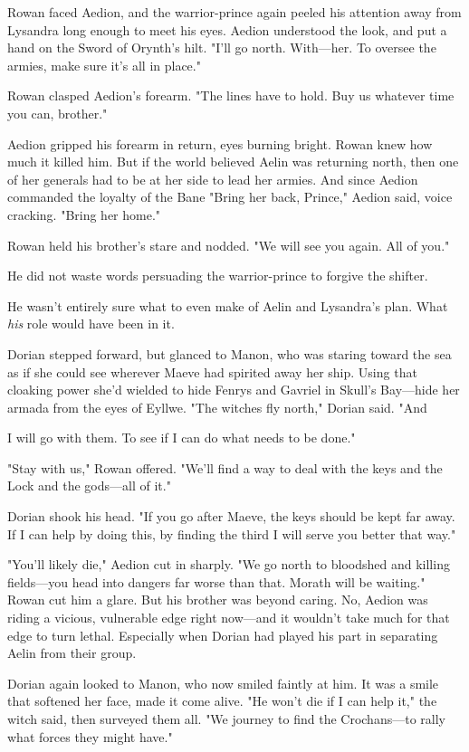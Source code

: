 Rowan faced Aedion, and the warrior-prince again peeled his attention away from Lysandra long enough to meet his eyes. Aedion understood the look, and put a hand on the Sword of Orynth's hilt. "I'll go north. With---her. To oversee the armies, make sure it's all in place."

Rowan clasped Aedion's forearm. "The lines have to hold. Buy us whatever time you can, brother."

Aedion gripped his forearm in return, eyes burning bright. Rowan knew how much it killed him. But if the world believed Aelin was returning north, then one of her generals had to be at her side to lead her armies. And since Aedion commanded the loyalty of the Bane 
"Bring her back, Prince," Aedion said, voice cracking. "Bring her home."

Rowan held his brother's stare and nodded. "We will see you again. All of you."

He did not waste words persuading the warrior-prince to forgive the shifter.

He wasn't entirely sure what to even make of Aelin and Lysandra's plan. What \emph{his} role would have been in it.

Dorian stepped forward, but glanced to Manon, who was staring toward the sea as if she could see wherever Maeve had spirited away her ship. Using that cloaking power she'd wielded to hide Fenrys and Gavriel in Skull's Bay---hide her armada from the eyes of Eyllwe. "The witches fly north," Dorian said. "And

I will go with them. To see if I can do what needs to be done."

"Stay with us," Rowan offered. "We'll find a way to deal with the keys and the Lock and the gods---all of it."

Dorian shook his head. "If you go after Maeve, the keys should be kept far away. If I can help by doing this, by finding the third  I will serve you better that way."

"You'll likely die," Aedion cut in sharply. "We go north to bloodshed and killing fields---you head into dangers far worse than that. Morath will be waiting." Rowan cut him a glare. But his brother was beyond caring. No, Aedion was riding a vicious, vulnerable edge right now---and it wouldn't take much for that edge to turn lethal. Especially when Dorian had played his part in separating Aelin from their group.

Dorian again looked to Manon, who now smiled faintly at him. It was a smile that softened her face, made it come alive. "He won't die if I can help it," the witch said, then surveyed them all. "We journey to find the Crochans---to rally what forces they might have."

